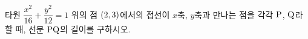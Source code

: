 타원 $\dfrac{x^2}{16}+\dfrac{y^2}{12}=1$ 위의 점 $(2{,}\mkern3mu\mathopen{}3)$에서의 접선이 $x$축, $y$축과 만나는 점을 각각 $\mathrm{P}$, $\mathrm{Q}$라 할 때, 선분 $\mathrm{PQ}$의 길이를 구하시오.
